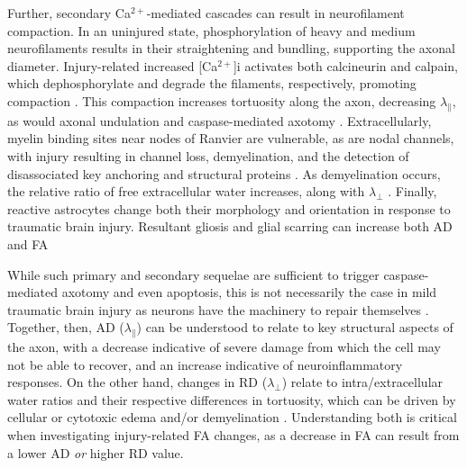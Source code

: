 \documentclass[]{imag-ms-template}
\begin{document}
Further, secondary Ca$^{2+}$-mediated cascades can result in neurofilament compaction. In an uninjured state, phosphorylation of heavy and medium neurofilaments results in their straightening and bundling, supporting the axonal diameter. Injury-related increased [Ca$^{2+}$]i activates both calcineurin and calpain, which dephosphorylate and degrade the filaments, respectively, promoting compaction \parencite{krieg2023IdentifyingPhenotypesDiffuse,pant1988DephosphorylationNeurofilamentProteins,chen1999EvolutionNeurofilamentSubtype}. This compaction increases tortuosity along the axon, decreasing $\lambda_\parallel$, as would axonal undulation and caspase-mediated axotomy \parencite{svandova2023MakingHeadCaspases}. Extracellularly, myelin binding sites near nodes of Ranvier are vulnerable, as are nodal channels, with injury resulting in channel loss, demyelination, and the detection of disassociated key anchoring and structural proteins \parencite{song2022ConcussionLeadsWidespread,zhu2016NodalTotalAxonal,krieg2023IdentifyingPhenotypesDiffuse}. As demyelination occurs, the relative ratio of free extracellular water increases, along with $\lambda_\perp$ \parencite{mayer2010ProspectiveDiffusionTensor,winklewski2018UnderstandingPhysiopathologyAxial}. Finally, reactive astrocytes change both their morphology and orientation in response to traumatic brain injury. Resultant gliosis and glial scarring can increase both AD and FA \parencite{budde2011ContributionGliosisDiffusion,churchill2017WhiteMatterMicrostructure,cieri2025AstrocytesReactiveAstrogliosis,mira2021TraumaticBrainInjury,sofroniew2009MolecularDissectionReactive}

While such primary and secondary sequelae are sufficient to trigger caspase-mediated axotomy and even apoptosis, this is not necessarily the case in mild traumatic brain injury as neurons have the machinery to repair themselves \parencite{franze2013MechanicsNeuronalDevelopment,sakai2019InflammationNeuralRepair}. Together, then, AD ($\lambda_\parallel$) can be understood to relate to key structural aspects of the axon, with a decrease indicative of severe damage from which the cell may not be able to recover, and an increase indicative of neuroinflammatory responses. On the other hand, changes in RD ($\lambda_\perp$) relate to intra/extracellular water ratios and their respective differences in tortuosity, which can be driven by cellular or cytotoxic edema and/or demyelination \parencite{borja2018DiffusionMRImaging,mayer2017SpectrumMildTraumatic,lindsey2023DiffusionWeightedImagingMild}. Understanding both is critical when investigating injury-related FA changes, as a decrease in FA can result from a lower AD \textit{or} higher RD value.
\end{document}
